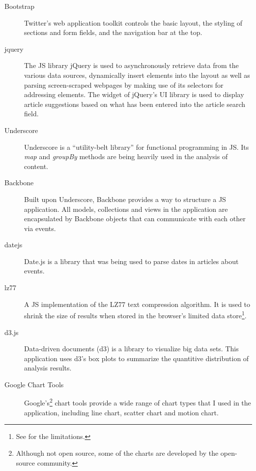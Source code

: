 \begin{description}
  \item[Bootstrap] Twitter's web application toolkit controls the basic layout, the styling of sections and form fields, and the navigation bar at the top.
  \item[jquery] The JS library jQuery is used to asynchronously retrieve data from the various data sources, dynamically insert elements into the layout as well as parsing screen-scraped webpages by making use of its selectors for addressing elements.
  The  widget of jQuery's UI library is used to display article suggestions based on what has been entered into the article search field.
  \item[Underscore] Underscore is a ``utility-belt library'' for functional programming in JS. 
  Its \emph{map} and \emph{groupBy} methods are being heavily used in the analysis of content.
  \item[Backbone] Built upon Underscore, Backbone provides a way to structure a JS application.
  All models, collections and views in the application are encapsulated by Backbone objects that can communicate with each other via events.
  \item[datejs] Date.js is a library that was being used to parse dates in articles about events.
  \item[lz77] A JS implementation of the LZ77 text compression algorithm. 
  It is used to shrink the size of results when stored in the browser's limited data store\footnote{See  for the limitations.}.
  \item[d3.js] Data-driven documents (d3) is a library to visualize big data sets. 
  This application uses d3's box plots to summarize the quantitive distribution of analysis results.
  \item[Google Chart Tools] Google's\footnote{Although not open source, some of the charts are developed by the open-source community.} chart tools provide a wide range of chart types that I used in the application, including line chart, scatter chart and motion chart.
\end{description}

